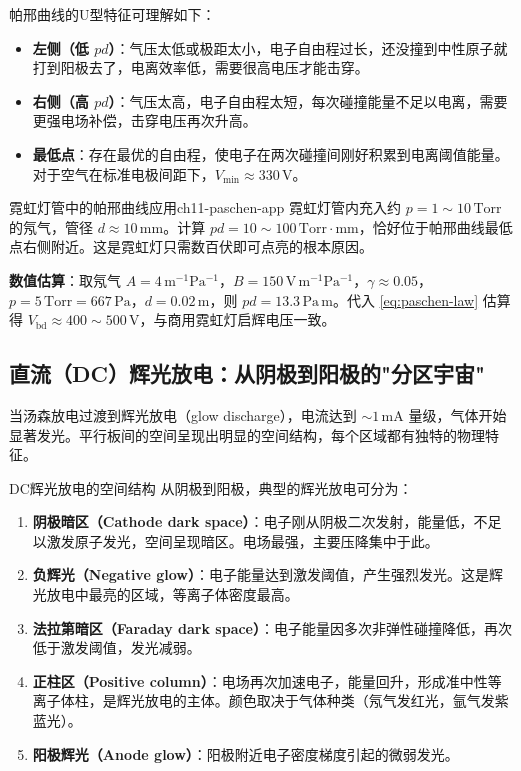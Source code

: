 \documentclass[12pt,a4paper,openany,oneside]{book}
\newcommand{\difficulty}[1]{\marginnote{\hfill\textcolor{coverMid!80}{\rule[-0.1em]{2pt}{0.9em}}\,\textcolor{coverMid}{\footnotesize\textbf{[#1]}}}}
\begin{document}
\begin{insight}{}{}
帕邢曲线的U型特征可理解如下：
\begin{itemize}
\item \textbf{左侧（低 $pd$）}：气压太低或极距太小，电子自由程过长，还没撞到中性原子就打到阳极去了，电离效率低，需要很高电压才能击穿。
\item \textbf{右侧（高 $pd$）}：气压太高，电子自由程太短，每次碰撞能量不足以电离，需要更强电场补偿，击穿电压再次升高。
\item \textbf{最低点}：存在最优的自由程，使电子在两次碰撞间刚好积累到电离阈值能量。对于空气在标准电极间距下，$V_{\text{min}} \approx 330\,\mathrm{V}$。
\end{itemize}
\end{insight}

\begin{example}{霓虹灯管中的帕邢曲线应用}{ch11-paschen-app}
\label{ex:neon-paschen}
\difficulty{基础}
霓虹灯管内充入约 $p = 1\sim 10\,\mathrm{Torr}$ 的氖气，管径 $d \approx 10\,\mathrm{mm}$。计算 $pd = 10\sim 100\,\mathrm{Torr\cdot mm}$，恰好位于帕邢曲线最低点右侧附近。这是霓虹灯只需数百伏即可点亮的根本原因。

\textbf{数值估算}：取氖气 $A = 4\,\mathrm{m^{-1}Pa^{-1}}$，$B = 150\,\mathrm{V\,m^{-1}Pa^{-1}}$，$\gamma \approx 0.05$，$p = 5\,\mathrm{Torr} = 667\,\mathrm{Pa}$，$d = 0.02\,\mathrm{m}$，则 $pd = 13.3\,\mathrm{Pa\,m}$。代入 \cref{eq:paschen-law} 估算得 $V_{\text{bd}} \approx 400\sim 500\,\mathrm{V}$，与商用霓虹灯启辉电压一致。
\end{example}

\subsection{直流（DC）辉光放电：从阴极到阳极的"分区宇宙"}

当汤森放电过渡到辉光放电（glow discharge），电流达到 $\sim 1\,\mathrm{mA}$ 量级，气体开始显著发光。平行板间的空间呈现出明显的空间结构，每个区域都有独特的物理特征。

\begin{definition}{DC辉光放电的空间结构}{}{}
\label{def:glow-regions}
从阴极到阳极，典型的辉光放电可分为：
\begin{enumerate}
\item \textbf{阴极暗区（Cathode dark space）}：电子刚从阴极二次发射，能量低，不足以激发原子发光，空间呈现暗区。电场最强，主要压降集中于此。
\item \textbf{负辉光（Negative glow）}：电子能量达到激发阈值，产生强烈发光。这是辉光放电中最亮的区域，等离子体密度最高。
\item \textbf{法拉第暗区（Faraday dark space）}：电子能量因多次非弹性碰撞降低，再次低于激发阈值，发光减弱。
\item \textbf{正柱区（Positive column）}：电场再次加速电子，能量回升，形成准中性等离子体柱，是辉光放电的主体。颜色取决于气体种类（氖气发红光，氩气发紫蓝光）。
\item \textbf{阳极辉光（Anode glow）}：阳极附近电子密度梯度引起的微弱发光。
\end{enumerate}
\end{definition}
\end{document}
